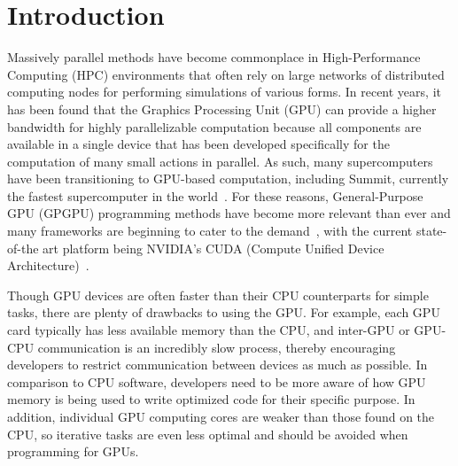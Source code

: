 \section*{Introduction}

Massively parallel methods have become commonplace in High-Performance Computing (HPC) environments that often rely on large networks of distributed computing nodes for performing simulations of various forms.
In recent years, it has been found that the Graphics Processing Unit (GPU) can provide a higher bandwidth for highly parallelizable computation because all components are available in a single device that has been developed specifically for the computation of many small actions in parallel.
As such, many supercomputers have been transitioning to GPU-based computation, including Summit, currently the fastest supercomputer in the world~\cite{kahle2019}.
For these reasons, General-Purpose GPU (GPGPU) programming methods have become more relevant than ever and many frameworks are beginning to cater to the demand~\cite{reyes2012, fatica2008, besard2016, opencl}, with the current state-of-the art platform being NVIDIA's CUDA (Compute Unified Device Architecture)~\cite{CUDAPG}.

Though GPU devices are often faster than their CPU counterparts for simple tasks, there are plenty of drawbacks to using the GPU.
For example, each GPU card typically has less available memory than the CPU, and inter-GPU or GPU-CPU communication is an incredibly slow process, thereby encouraging developers to restrict communication between devices as much as possible.
In comparison to CPU software, developers need to be more aware of how GPU memory is being used to write optimized code for their specific purpose.
In addition, individual GPU computing cores are weaker than those found on the CPU, so iterative tasks are even less optimal and should be avoided when programming for GPUs.

